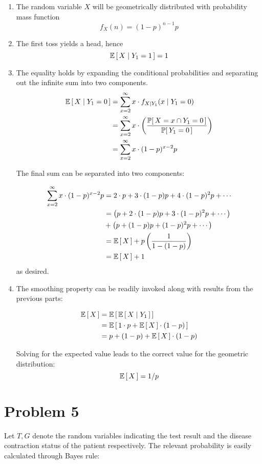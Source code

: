 \documentclass[12pt]{article}%
\begin{document}
\begin{enumerate}
  \item The random variable $X$ will be geometrically distributed with probability mass function \[ f_X(n) = (1-p)^{n-1}p \]

  \item The first toss yields a head, hence
  \[ \mathbb{E}\left[\,X \mid Y_1 = 1\,\right] = 1 \]

  \item The equality holds by expanding the conditional probabilities and separating out the infinite sum into two components.
  \begin{align*}
    \mathbb{E}\left[\,X \mid Y_1 = 0\,\right] & = \sum_{x = 2}^\infty x \cdot f_{X \mid Y_1}(x  \mid Y_1 = 0) \\
    & = \sum_{x = 2}^\infty x \cdot \left( \frac{\mathbb{P}[\,X = x \cap Y_1 = 0\,]}{\mathbb{P}[\,Y_1 = 0\,]}\right) \\
    & = \sum_{x = 2}^\infty x \cdot (1-p)^{x-2}p
  \end{align*}

  The final sum can be separated into two components:

  \begin{align*}
    \sum_{x = 2}^\infty x \cdot (1-p)^{x-2}p & = 2\cdot p + 3\cdot (1-p)p + 4\cdot(1-p)^2p + \cdots \\
    & = \left(p + 2\cdot (1-p)p + 3\cdot(1-p)^2p + \cdots \right) \\
     &  + \left(p + (1-p)p + (1-p)^2 p + \cdots \right) \\
     & = \mathbb{E}\left[\,X\,\right] + p\left(\frac{1}{1 - (1-p)}\right) \\
     & = \mathbb{E}\left[\,X\,\right] + 1
  \end{align*}
  as desired.

  \item
  The smoothing property can be readily invoked along with results from the previous parts:

 \begin{align*}
   \mathbb{E}\left[\,X\,\right] & = \mathbb{E}\left[\,\mathbb{E}\left[\,X \mid Y_1\,\right]\,\right] \\
   & = \mathbb{E}\left[\, 1\cdot p  + \mathbb{E}\left[\,X\,\right]\cdot (1-p)\,\right] \\
   & = p + (1-p) + \mathbb{E}\left[\,X\,\right]\cdot(1-p) \\
 \end{align*}

  Solving for the expected value leads to the correct value for the geometric distribution:
  \[\mathbb{E}\left[\,X\,\right] = 1/p \]
\end{enumerate}

\section{Problem 5}
Let $T,G$ denote the random variables indicating the test result and the disease contraction status of the patient respectively. The relevant probability is easily calculated through Bayes rule:
\end{document}
